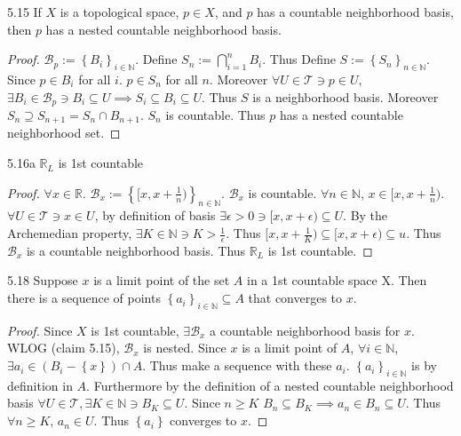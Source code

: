 \documentclass{article}
\newcommand*{\T}{\mathcal{T}}
\newcommand*{\B}{\mathcal{B}}
\newcommand*{\subeq}{\subseteq}
\newcommand{\R}{\mathbb{R}}
\newcommand{\N}{\mathbb{N}}
\begin{document}
\begin{claim}{5.15}\label{Claim 5.15.}
    If $X$ is a topological space, $p \in X$, and $p$ has a countable neighborhood basis, then $p$ has a nested countable neighborhood basis.    
\end{claim}
\begin{proof}
    $\B_p := \left\{ B_i \right\}_{i \in \N}$. Define $S_n := \bigcap_{i = 1}^{n} B_i$. Thus Define $S := \left\{ S_n \right\}_{n \in \N}$. Since $p \in B_i$ for all $i$. $p \in S_n$ for all $n$. Moreover $\forall U \in \T \ni p \in U$, $\exists B_i \in \B_p \ni B_i \subseteq U \implies S_i \subseteq B_i \subseteq U$. Thus $S$ is a neighborhood basis. Moreover $S_n \supseteq S_{n + 1} = S_n \cap B_{n + 1}$. $S_n$ is countable. Thus $p$ has a nested countable neighborhood set.                    
\end{proof}

\bigskip

\begin{PROB}{5.16a}\label{Problem 5.16a.}
    $\R_L$ is 1st countable 
\end{PROB}
\begin{proof}
    $\forall x \in \R$. $\B_{x} := \left\{ [x, x + \frac{1}{n}) \right\}_{n \in \N}$. $\B_x$ is countable. $\forall n \in \N$, $x \in [x, x + \frac{1}{n})$. $\forall U \in \T \ni x \in U$, by definition of basis $\exists \epsilon > 0 \ni [x, x + \epsilon) \subeq U$. By the Archemedian property, $\exists K \in \N \ni K > \frac{1}{\epsilon}$. Thus $[x, x + \frac{1}{K}) \subseteq [x, x + \epsilon) \subseteq u$. Thus $\B_x$ is a countable neighborhood basis. Thus $\R_L$ is 1st countable.             
\end{proof}

\bigskip

\begin{claim}{5.18}\label{Claim 5.18.}
    Suppose $x$ is a limit point of the set $A$ in a 1st countable space X. Then there is a sequence of points $\left\{ a_i \right\}_{i \in \N} \subeq A$ that converges to $x$.     
\end{claim}
\begin{proof}
    Since $X$ is 1st countable, $\exists \B_x$ a countable neighborhood basis for $x$. WLOG (claim 5.15), $\B_x$ is nested. Since $x$ is a limit point of $A$, $\forall i \in \N$, $\exists a_i \in \left(B_i - \left\{ x \right\}\right) \cap A $. Thus make a sequence with these $a_i$. $\left\{ a_i \right\}_{i \in \N}$ is by definition in $A$. Furthermore by the definition of a nested countable neighborhood basis $\forall U \in \T, \exists K \in \N \ni B_K \subseteq U$. Since $n \geq K$ $B_n \subeq B_K \implies a_n \in B_n \subeq U$. Thus $\forall n \geq K$, $a_n \in U$. Thus $\left\{ a_i \right\}$ converges to $x$.                 
\end{proof}
\end{document}
